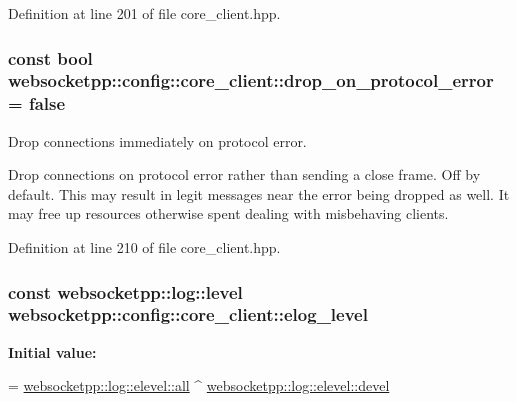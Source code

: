 Definition at line 201 of file core\+\_\+client.\+hpp.

\hypertarget{structwebsocketpp_1_1config_1_1core__client_aa43f6d2b983e0d8feb5e0bc1d9ad1be9}{}
\subsubsection[{drop\+\_\+on\+\_\+protocol\+\_\+error}]{\setlength{\rightskip}{0pt plus 5cm}const bool websocketpp\+::config\+::core\+\_\+client\+::drop\+\_\+on\+\_\+protocol\+\_\+error = false\hspace{0.3cm}{\ttfamily [static]}}\label{structwebsocketpp_1_1config_1_1core__client_aa43f6d2b983e0d8feb5e0bc1d9ad1be9}


Drop connections immediately on protocol error. 

Drop connections on protocol error rather than sending a close frame. Off by default. This may result in legit messages near the error being dropped as well. It may free up resources otherwise spent dealing with misbehaving clients. 

Definition at line 210 of file core\+\_\+client.\+hpp.

\hypertarget{structwebsocketpp_1_1config_1_1core__client_a653fda222bcedbaff664e60a517d0fa9}{}
\subsubsection[{elog\+\_\+level}]{\setlength{\rightskip}{0pt plus 5cm}const {\bf websocketpp\+::log\+::level} websocketpp\+::config\+::core\+\_\+client\+::elog\+\_\+level\hspace{0.3cm}{\ttfamily [static]}}\label{structwebsocketpp_1_1config_1_1core__client_a653fda222bcedbaff664e60a517d0fa9}
{\bfseries Initial value\+:}
\begin{DoxyCode}
=
        \hyperlink{structwebsocketpp_1_1log_1_1elevel_a9b31ff708c221d314f9f4eb3ff2b1ad7}{websocketpp::log::elevel::all} ^ 
      \hyperlink{structwebsocketpp_1_1log_1_1elevel_a0b1dbc650c6f2711522c096496423726}{websocketpp::log::elevel::devel}
\end{DoxyCode}



